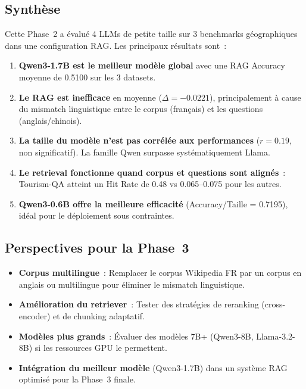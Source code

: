 \documentclass[12pt,a4paper]{article}
\begin{document}
\subsection{Synth\`ese}

Cette Phase~2 a \'evalu\'e 4 LLMs de petite taille sur 3 benchmarks g\'eographiques dans une configuration RAG. Les principaux r\'esultats sont~:

\begin{enumerate}[leftmargin=*]
    \item \textbf{Qwen3-1.7B est le meilleur mod\`ele global} avec une RAG Accuracy moyenne de 0.5100 sur les 3 datasets.
    \item \textbf{Le RAG est inefficace} en moyenne ($\Delta = -0.0221$), principalement \`a cause du mismatch linguistique entre le corpus (fran\c{c}ais) et les questions (anglais/chinois).
    \item \textbf{La taille du mod\`ele n'est pas corr\'el\'ee aux performances} ($r = 0.19$, non significatif). La famille Qwen surpasse syst\'ematiquement Llama.
    \item \textbf{Le retrieval fonctionne quand corpus et questions sont align\'es}~: Tourism-QA atteint un Hit Rate de 0.48 vs 0.065--0.075 pour les autres.
    \item \textbf{Qwen3-0.6B offre la meilleure efficacit\'e} (Accuracy/Taille = 0.7195), id\'eal pour le d\'eploiement sous contraintes.
\end{enumerate}

\subsection{Perspectives pour la Phase~3}

\begin{itemize}[leftmargin=*]
    \item \textbf{Corpus multilingue}~: Remplacer le corpus Wikipedia FR par un corpus en anglais ou multilingue pour \'eliminer le mismatch linguistique.
    \item \textbf{Am\'elioration du retriever}~: Tester des strat\'egies de reranking (cross-encoder) et de chunking adaptatif.
    \item \textbf{Mod\`eles plus grands}~: \'Evaluer des mod\`eles 7B+ (Qwen3-8B, Llama-3.2-8B) si les ressources GPU le permettent.
    \item \textbf{Int\'egration du meilleur mod\`ele} (Qwen3-1.7B) dans un syst\`eme RAG optimis\'e pour la Phase~3 finale.
\end{itemize}

\newpage


\end{document}
